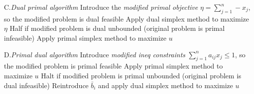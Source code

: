 \item{C.}\emph{Dual primal algorithm}\smallskip
{}Introduce the \emph{modified primal objective} $\eta=\sum_{j=1}^n-x_j$,
so the modified problem is dual feasible\smallskip
{}Apply dual simplex method to maximize $\eta$\smallskip
{}Half if modified problem is dual unbounded (original problem is
primal infeasible)\smallskip
{}Apply primal simplex method to maximize $u$\smallskip

\item{D.}\emph{Primal dual algorithm}\smallskip
{}Introduce \emph{modified ineq constraints} $\sum_{j=1}^na_{ij}
x_j\leq 1$, so the modified problem is primal feasible\smallskip
{}Apply primal simplex method to maximize $u$\smallskip
{}Halt if modified problem is primal unbounded (original problem is
dual infeasible)\smallskip
{}Reintroduce $\bar{b}_i$ and apply dual simplex method to maximize $u$
\smallskip

